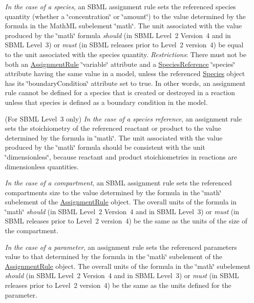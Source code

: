\begin{DoxyItemize}
\item {\itshape In the case of a species}, an S\+B\+ML assignment rule sets the referenced species\textquotesingle{} quantity (whether a \char`\"{}concentration\char`\"{} or \char`\"{}amount\char`\"{}) to the value determined by the formula in the Math\+ML subelement \char`\"{}math\char`\"{}. The unit associated with the value produced by the \char`\"{}math\char`\"{} formula {\itshape should} (in S\+B\+ML Level~2 Version~4 and in S\+B\+ML Level~3) or {\itshape must} (in S\+B\+ML releases prior to Level~2 version~4) be equal to the unit associated with the species\textquotesingle{} quantity. {\itshape Restrictions}\+: There must not be both an \hyperlink{class_assignment_rule}{Assignment\+Rule} \char`\"{}variable\char`\"{} attribute and a \hyperlink{class_species_reference}{Species\+Reference} \char`\"{}species\char`\"{} attribute having the same value in a model, unless the referenced \hyperlink{class_species}{Species} object has its \char`\"{}boundary\+Condition\char`\"{} attribute set to {\ttfamily true}. In other words, an assignment rule cannot be defined for a species that is created or destroyed in a reaction unless that species is defined as a boundary condition in the model.


\item (For S\+B\+ML Level~3 only) {\itshape In the case of a species reference}, an assignment rule sets the stoichiometry of the referenced reactant or product to the value determined by the formula in \char`\"{}math\char`\"{}. The unit associated with the value produced by the \char`\"{}math\char`\"{} formula should be consistent with the unit \char`\"{}dimensionless\char`\"{}, because reactant and product stoichiometries in reactions are dimensionless quantities.


\item {\itshape In the case of a compartment}, an S\+B\+ML assignment rule sets the referenced compartment\textquotesingle{}s size to the value determined by the formula in the \char`\"{}math\char`\"{} subelement of the \hyperlink{class_assignment_rule}{Assignment\+Rule} object. The overall units of the formula in \char`\"{}math\char`\"{} {\itshape should} (in S\+B\+ML Level~2 Version~4 and in S\+B\+ML Level~3) or {\itshape must} (in S\+B\+ML releases prior to Level~2 version~4) be the same as the units of the size of the compartment.


\item {\itshape In the case of a parameter}, an assignment rule sets the referenced parameter\textquotesingle{}s value to that determined by the formula in the \char`\"{}math\char`\"{} subelement of the \hyperlink{class_assignment_rule}{Assignment\+Rule} object. The overall units of the formula in the \char`\"{}math\char`\"{} subelement {\itshape should} (in S\+B\+ML Level~2 Version~4 and in S\+B\+ML Level~3) or {\itshape must} (in S\+B\+ML releases prior to Level~2 version~4) be the same as the units defined for the parameter.



\end{DoxyItemize}
